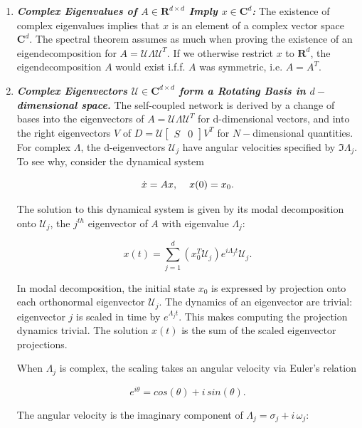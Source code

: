 \begin{enumerate}

\item \textbf{\textit{Complex Eigenvalues of $A \in \mathbf{R}^{d \times d}$ Imply $x \in \mathbf{C}^d$: }} 
The existence of complex eigenvalues implies that $x$ is an element of a complex vector space $\mathbf{C}^d$. The spectral theorem assumes as much when proving the existence of an eigendecomposition for $A = \mathcal{U} \Lambda \mathcal{U}^T$. If we otherwise restrict $x$ to $\mathbf{R}^d$, the eigendecomposition $A$ would exist i.f.f. $A$ was symmetric, i.e. $A = A^T$. 



\item \textbf{\textit{Complex Eigenvectors $\mathcal{U} \in \mathbf{C}^{d \times d}$ form a Rotating Basis in $d-$dimensional space.}} The self-coupled network is derived by a change of bases into the eigenvectors of $A = \mathcal{U} \Lambda \mathcal{U}^T$ for d-dimensional vectors, and into the right eigenvectors $V$ of $D = \mathcal{U}\begin{bmatrix} S & 0 \end{bmatrix} V^T$ for $N-$dimensional quantities. For complex $\Lambda$, the d-eigenvectors $\mathcal{U}_j$ have angular velocities specified by $\Im \Lambda_j$. To see why, consider the dynamical system

$$
\dot{x} = Ax, \hspace{4mm} x(0) = x_0.
$$

The solution to this dynamical system is given by its modal decomposition onto $\mathcal{U}_j$, the $j^{th}$ eigenvector of $A$ with eigenvalue $\Lambda_j$:

$$
x(t) = \sum_{j=1}^{d} \left(x_0^T \mathcal{U}_j\right) e^{i \Lambda_j t} \mathcal{U}_j.
$$

In modal decomposition, the initial state $x_0$ is expressed by projection onto each orthonormal eigenvector $\mathcal{U}_j$. The dynamics of an eigenvector are trivial: eigenvector $j$ is scaled in time by $e^{\Lambda_j t}$. This makes computing the projection dynamics  trivial. The solution $x(t)$ is the sum of the scaled eigenvector projections. 


When $\Lambda_j$ is complex, the scaling takes an angular velocity via Euler's relation

$$
e^{i \theta} = cos(\theta) + i \, sin(\theta).
$$

The angular velocity is the imaginary component of $\Lambda_j = \sigma_j + i \, \omega_j$: 


\end{enumerate}
